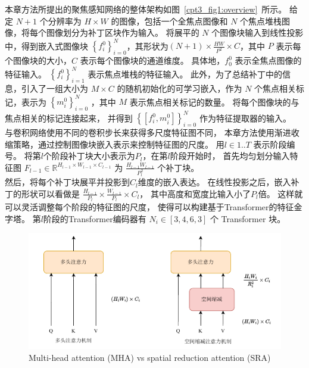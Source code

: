 本章方法所提出的聚焦感知网络的整体架构如图~\ref{cpt3_fig1:overview}~所示。
给定 $N + 1$ 个分辨率为 $ H \times W $ 的图像，包括一个全焦点图像和 $N$ 个焦点堆栈图像，将每个图像划分为补丁区块作为输入。 
将展平的 $N$ 个图像块输入到线性投影中，得到嵌入式图像块 $ \left \{ f_{i}^{0} \right \}_{i=0}^{N} $，其形状为$ \left ( N + 1 \right ) \times \frac{HW}{P^{2}} \times C  $，其中 $P$ 表示每个图像块的大小，$C$ 表示每个图像块的通道维度。 
%
%
%
具体地，$ f_{0}^{0} $ 表示全焦点图像的特征输入。 
$ \left \{ f_{i}^{0} \right \}_{i=1}^{N} $ 表示焦点堆栈的特征输入。 
此外，为了总结补丁中的信息，引入了一组大小为 $ M \times C $ 的随机初始化的可学习嵌入，作为 $N$ 个焦点相关标记，表示为 $ \left \{ m_{i}^{0} \right \}_{i=0}^{N} $ ，其中 $M$ 表示焦点相关标记的数量。 
将每个图像块的与焦点相关的标记连接起来，
并得到 $ \left \{ \left [ f_{i}^{0},m_{i}^{0}  \right ]  \right \}_{i=0}^{N} $ 作为特征提取器的输入。 
\\
%
%
%
%
\indent
与卷积网络使用不同的卷积步长来获得多尺度特征图不同，
本章方法使用渐进收缩策略，通过控制图像块嵌入表示来控制特征图的尺度。
用$ l \in 1..T $ 表示阶段编号。 
将第$l$个阶段补丁块大小表示为$P_{l}$，在第$l$阶段开始时，
首先均匀划分输入特征图
$F_{l-1} \in \mathbb{R}^{H_{l-1} \times W_{l-1} \times C_{l-1}}$
为
$ \frac{H_{l-1}W_{l-1}}{P_{l}^{2}} $
个补丁块。
\\
%
%
%
%
\indent
然后，将每个补丁块展平并投影到$C_{l}$维度的嵌入表达。
在线性投影之后，嵌入补丁的形状可以看做是
$\frac{H_{l-1}}{P_{l}} \times \frac{W_{l-1}}{P_{l}} \times C_{l} $，
其中高度和宽度比输入小了$P_{l}$倍。
这样就可以灵活调整每个阶段的特征图的尺度，
使得可以构建基于Transformer的特征金字塔。
第$l$阶段的Transformer编码器有 $ N_{i} \in [3,4,6,3] $ 个 Transformer 块。
%
%
\begin{figure}[!ht]
	\centering
	\includegraphics[width=0.95\linewidth]{figures/chapter3/sra}
	{Multi-head attention (MHA) vs spatial reduction attention (SRA)}  
	\label{cpt3_fig1:sra}
\end{figure}
